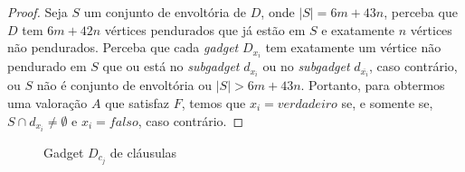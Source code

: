 \begin{theorem}
\begin{proof}
    Seja $S$ um conjunto de envoltória de $D$, onde $|S| = 6m + 43n$, perceba que $D$ tem $6m +42n$ vértices pendurados que já estão em $S$ e exatamente $n$ vértices não pendurados. Perceba que cada \emph{gadget} $D_{x_i}$ tem exatamente um vértice não pendurado em $S$ que ou está no \emph{subgadget} $d_{x_i}$ ou no \emph{subgadget} $d_{\overline{x_i}}$, caso contrário, ou $S$ não é conjunto de envoltória ou $|S| > 6m + 43n$. Portanto, para obtermos uma valoração $A$ que satisfaz $F$, temos que $x_i = verdadeiro$ se, e somente se, $S \cap d_{x_i} \neq \emptyset$ e $x_i = falso$, caso contrário.

    \end{proof}
\end{theorem}

\begin{figure}[ht]
    \centering
    \resizebox{.3\textwidth}{!}{}
    \caption{Gadget $D_{c_j}$ de cláusulas}\label{fig:gadgetClHn}
\end{figure}
    



